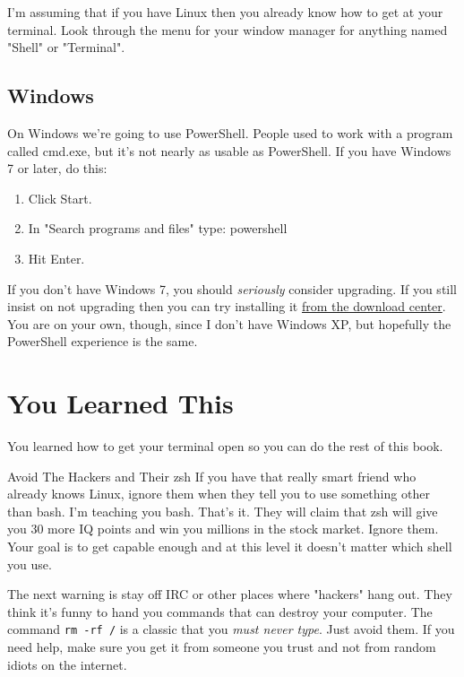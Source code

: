 I'm assuming that if you have Linux then you already know how to get at your terminal.  Look through the
menu for your window manager for anything named "Shell" or "Terminal".

\subsection{Windows}

On Windows we're going to use PowerShell. People used to work with a program called cmd.exe, but it's not nearly as usable as PowerShell. If you have Windows 7 or later, do this:

\begin{enumerate}
\item Click Start.
\item In "Search programs and files" type: powershell
\item Hit Enter.
\end{enumerate}

If you don't have Windows 7, you should \emph{seriously} consider upgrading. If you
still insist on not upgrading then you can try installing it
\href{http://www.microsoft.com/download/en/details.aspx?displaylang=en&id=16818}{from
the download center}. You are on your own, though, since I don't have Windows
XP, but hopefully the PowerShell experience is the same. 

\section{You Learned This}

You learned how to get your terminal open so you can do the rest of this book.

\begin{aside}{Avoid The Hackers and Their zsh}
If you have that really smart friend who already knows Linux, ignore them when they tell you to use something
other than bash.  I'm teaching you bash.  That's it.  They will claim that zsh will give you 30 more IQ points
and win you millions in the stock market.  Ignore them.  Your goal is to get capable enough and at this level
it doesn't matter which shell you use.

The next warning is stay off IRC or other places where "hackers" hang out.  They think it's funny to hand you
commands that can destroy your computer.  The command \verb|rm -rf /| is a classic that you \emph{must never type}.
Just avoid them.  If you need help, make sure you get it from someone you trust and not from random idiots on the
internet.
\end{aside}

